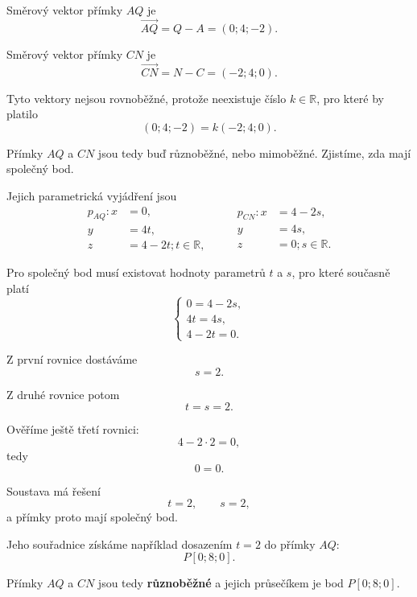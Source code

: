 \begin{example}
    Směrový vektor přímky $AQ$ je
    \[
        \overrightarrow{AQ}
        =Q-A
        =(0;4;-2).
    \]

    Směrový vektor přímky $CN$ je
    \[
        \overrightarrow{CN}
        =N-C
        =(-2;4;0).
    \]

    Tyto vektory nejsou rovnoběžné, protože neexistuje číslo
    $k\in\mathbb{R}$, pro které by platilo
    \[
        (0;4;-2)=k(-2;4;0).
    \]

    Přímky $AQ$ a $CN$ jsou tedy buď různoběžné, nebo mimoběžné.
    Zjistíme, zda mají společný bod.

    Jejich parametrická vyjádření jsou
    \[
        \begin{aligned}
            p_{AQ}: x&=0,\\
                    y&=4t,\\
                    z&=4-2t; t\in\mathbb{R},
        \end{aligned}
        \qquad
        \begin{aligned}
            p_{CN}: x&=4-2s,\\
                    y&=4s,\\
                    z&=0; s\in\mathbb{R}.
        \end{aligned}
    \]

    Pro společný bod musí existovat hodnoty parametrů $t$ a $s$,
    pro které současně platí
    \[
        \begin{cases}
            0=4-2s,\\
            4t=4s,\\
            4-2t=0.
        \end{cases}
    \]

    Z první rovnice dostáváme
    \[
        s=2.
    \]

    Z druhé rovnice potom
    \[
        t=s=2.
    \]

    Ověříme ještě třetí rovnici:
    \[
        4-2\cdot2=0,
    \]
    tedy
    \[
        0=0.
    \]

    Soustava má řešení
    \[
        t=2,\qquad s=2,
    \]
    a přímky proto mají společný bod.

    Jeho souřadnice získáme například dosazením $t=2$
    do přímky $AQ$:
    \[
        P[0;8;0].
    \]

    Přímky $AQ$ a $CN$ jsou tedy \textbf{různoběžné}
    a jejich průsečíkem je bod $P[0;8;0]$.

\end{example}

